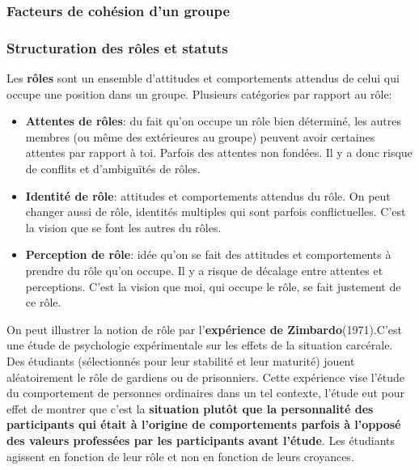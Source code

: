 \documentclass[12pt]{article}
\begin{document}
		
		\subsubsection{Facteurs de cohésion d’un groupe}
		
		
				
		\subsubsection{Structuration des rôles et statuts}
		
		Les \textbf{rôles} sont un ensemble d'attitudes et comportements attendus de celui qui occupe une position dans un groupe. \newline 
		Plusieurs catégories par rapport au rôle:
		\begin{itemize}
		\item \textbf{Attentes de rôles}: du fait qu'on occupe un rôle bien déterminé, les autres membres (ou même des extérieures au groupe) peuvent avoir certaines attentes par rapport à toi. Parfois des attentes non fondées. Il y a donc risque de conflits et d'ambiguïtés de rôles.
		\item \textbf{Identité de rôle}: attitudes et comportements attendus du rôle. On peut changer aussi de rôle, identités multiples qui sont parfois conflictuelles. C'est la vision que se font les autres du rôles.
		\item \textbf{Perception de rôle}: idée qu'on se fait des attitudes et comportements à prendre du rôle qu'on occupe. Il y a risque de décalage entre attentes et perceptions. C'est la vision que moi, qui occupe le rôle, se fait justement de ce rôle. \newline
		\end{itemize}
		
		On peut illustrer la notion de rôle par l'\textbf{expérience de Zimbardo}(1971).C'est une étude  de  psychologie  expérimentale  sur  les  effets  de  la  situation  carcérale. Des  étudiants 
(sélectionnés  pour  leur  stabilité  et  leur  maturité) jouent  aléatoirement  le  rôle  de  gardiens  ou  de 
prisonniers. Cette expérience vise l’étude du comportement de personnes ordinaires dans un tel contexte, l’étude 
eut pour effet de montrer que c’est la \textbf{situation plutôt que la personnalité des participants qui était 
à l’origine de comportements parfois à l’opposé des valeurs professées par les participants avant 
l’étude}. Les étudiants agissent en fonction de leur rôle et non en fonction de leurs croyances. \newline
\end{document}
